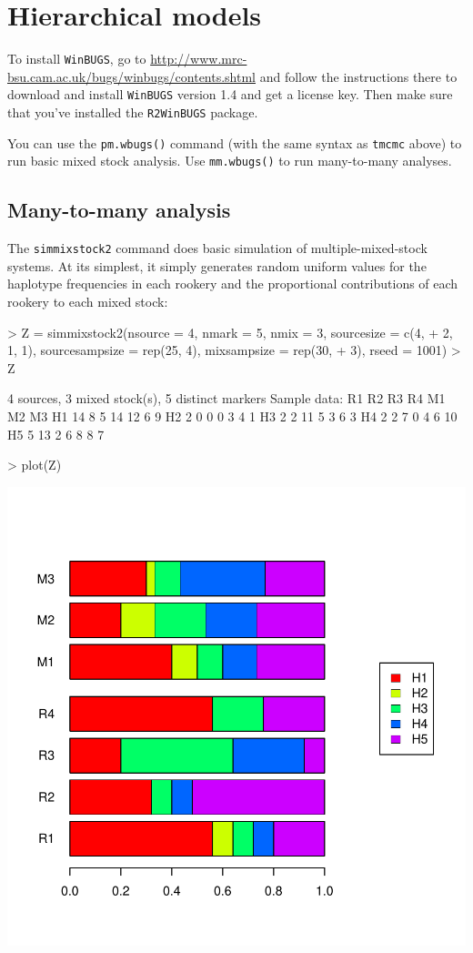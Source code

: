 \documentclass[11pt]{article}
\begin{document}
\section{Hierarchical models}

To install {\tt WinBUGS}, go to
\url{http://www.mrc-bsu.cam.ac.uk/bugs/winbugs/contents.shtml}
and follow the instructions there to download and install {\tt WinBUGS} version 1.4
and get a license key.  Then make sure that you've installed
the {\tt R2WinBUGS} package.

You can use the {\tt pm.wbugs()} command (with the same syntax
as {\tt tmcmc} above) to run basic mixed stock analysis.
Use {\tt mm.wbugs()} to run many-to-many analyses.

\subsection{Many-to-many analysis}

The {\tt simmixstock2} command does basic simulation
of multiple-mixed-stock systems.  At its simplest,
it simply generates random uniform values for
the haplotype frequencies in each rookery
and the proportional contributions of each
rookery to each mixed stock:

\begin{Schunk}
\begin{Sinput}
> Z = simmixstock2(nsource = 4, nmark = 5, nmix = 3, sourcesize = c(4, 
+     2, 1, 1), sourcesampsize = rep(25, 4), mixsampsize = rep(30, 
+     3), rseed = 1001)
> Z
\end{Sinput}
\begin{Soutput}
4 sources, 3 mixed stock(s), 5 distinct markers
Sample data:
   R1 R2 R3 R4 M1 M2 M3
H1 14  8  5 14 12  6  9
H2  2  0  0  0  3  4  1
H3  2  2 11  5  3  6  3
H4  2  2  7  0  4  6 10
H5  5 13  2  6  8  8  7
\end{Soutput}
\begin{Sinput}
> plot(Z)
\end{Sinput}
\end{Schunk}
\includegraphics{mixstock-034}
\end{document}
